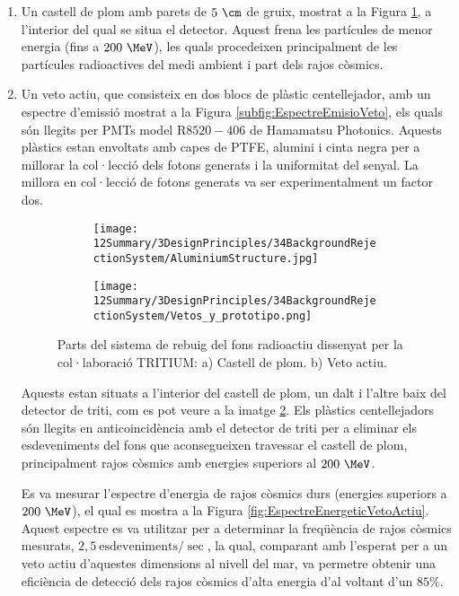 \begin{enumerate}

\item{} Un castell de plom amb parets de $5~\cm$ de gruix, mostrat a la Figura \ref{subfig:CastellPlom}, a l'interior del qual se situa el detector. Aquest frena les partícules de menor energia (fins a $200~\MeV$), les quals procedeixen principalment de les partícules radioactives del medi ambient i part dels rajos còsmics.

\item{} Un veto actiu, que consisteix en dos blocs de plàstic centellejador, amb un espectre d'emissió mostrat a la Figura \ref{subfig:EspectreEmisioVeto}, els quals són llegits per PMTs model R$8520-406$ de Hamamatsu Photonics. Aquests plàstics estan envoltats amb capes de PTFE, alumini i cinta negra per a millorar la col·lecció dels fotons generats i la uniformitat del senyal. La millora en col·lecció de fotons generats va ser experimentalment un factor dos.
\begin{figure}
\centering
    \begin{subfigure}[b]{0.7\textwidth}
    \centering
    \texttt{[image: 12Summary/3DesignPrinciples/34BackgroundRejectionSystem/AluminiumStructure.jpg]}  
        \caption{}\label{subfig:CastellPlom}
    \end{subfigure}
    \hfill
    \begin{subfigure}[b]{0.7\textwidth}
    \centering
    \texttt{[image: 12Summary/3DesignPrinciples/34BackgroundRejectionSystem/Vetos\_y\_prototipo.png]}  
    \caption{\label{subfig:VetoActiu}}
    \end{subfigure}
\caption{Parts del sistema de rebuig del fons radioactiu dissenyat per la col·laboració TRITIUM: a) Castell de plom. b) Veto actiu. \label{fig:SistemaRebuigFonsRadioactiu}}
\end{figure}
Aquests estan situats a l'interior del castell de plom, un dalt i l'altre baix del detector de triti, com es pot veure a la imatge \ref{subfig:VetoActiu}. Els plàstics centellejadors són llegits en anticoincidència amb el detector de triti per a eliminar els esdeveniments del fons que aconsegueixen travessar el castell de plom, principalment rajos còsmics amb energies superiors al $200~\MeV$. 

Es va mesurar l'espectre d'energia de rajos còsmics durs (energies superiors a $200~\MeV$), el qual es mostra a la Figura \ref{fig:EspectreEnergeticVetoActiu}. Aquest espectre es va utilitzar per a determinar la freqüència de rajos còsmics mesurats, $2,5~\text{esdeveniments}/\sec$, la qual, comparant amb l'esperat per a un veto actiu d'aquestes dimensions al nivell del mar, va permetre obtenir una eficiència de detecció dels rajos còsmics d'alta energia d'al voltant d'un $85\%$.


\end{enumerate}
